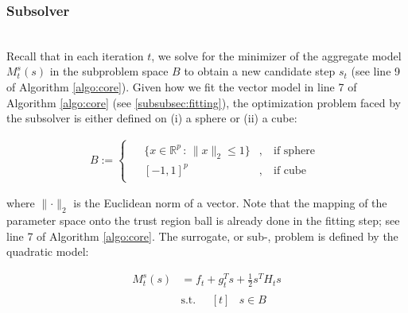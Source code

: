 \subsubsection{Subsolver}
\label{subsubsec:subsolver}
\hfill\\

\noindent Recall that in each iteration $t$, we solve for the minimizer of the aggregate model $M_{t}^{s} (s)$ in the subproblem space $B$ to obtain a new candidate step $s_t$ (see line 9 of Algorithm \ref{algo:core}).
Given how we fit the vector model in line 7 of Algorithm \ref{algo:core} (see \ref{subsubsec:fitting}), the optimization problem faced by the subsolver is either defined on (i) a sphere or (ii) a cube:


\begin{align}
    B := \begin{cases}
    \begin{aligned}
        & \{x \in \mathbb{R}^p \, : \, \lVert x \rVert_2 \leq 1 \} & , \ & \text{if sphere} \\
        & [-1, 1]^p & , \ & \text{if cube}
    \end{aligned}
    \end{cases}
    \label{eq:ball-metric}
\end{align}

\noindent where $\lVert\cdot\rVert_2$ is the Euclidean norm of a vector.
Note that the mapping of the parameter space onto the trust region ball is already done in the fitting step; see line 7 of Algorithm \ref{algo:core}.
The surrogate, or sub-, problem is defined by the quadratic model:

\begin{align}
    M_{t}^{s} (s) &= f_t + g_t^T s + \frac{1}{2} s^T H_t s \\
    &\text{s.t.} \quad \begin{aligned}[t]
        & s \in B
    \end{aligned}
    \label{eq:quad-subproblem}
\end{align}


